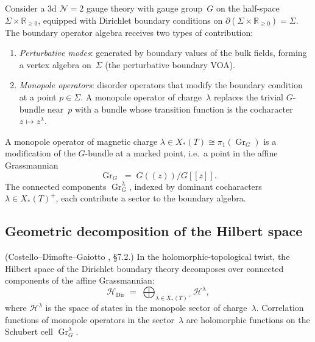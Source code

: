 \providecommand{\GrG}{\operatorname{Gr}_G}

Consider a 3d $\mathcal{N}=2$ gauge theory with gauge group~$G$ on
the half-space $\Sigma \times \mathbb{R}_{\geq 0}$, equipped with
Dirichlet boundary conditions on $\partial(\Sigma \times
\mathbb{R}_{\geq 0}) = \Sigma$. The boundary operator algebra
receives two types of contribution:
\begin{enumerate}[label=(\roman*),nosep]
\item \emph{Perturbative modes}: generated by boundary values of the
 bulk fields, forming a vertex algebra on~$\Sigma$ (the perturbative
 boundary VOA).
\item \emph{Monopole operators}: disorder operators that modify the
 boundary condition at a point $p \in \Sigma$. A monopole operator
 of charge~$\lambda$ replaces the trivial $G$-bundle near~$p$ with a
 bundle whose transition function is the cocharacter
 $z \mapsto z^\lambda$.
\end{enumerate}

\begin{definition}
\label{def:monopole-grassmannian}
A monopole operator of magnetic charge
$\lambda \in X_*(T) \cong \pi_1(\GrG)$ is a modification of the
$G$-bundle at a marked point, i.e.\ a point in the affine
Grassmannian
\begin{equation}\label{eq:affine-grassmannian-def}
 \GrG \;=\; G(\!(z)\!)/G[\![z]\!].
\end{equation}
The connected components $\GrG^\lambda$, indexed by dominant
cocharacters $\lambda \in X_*(T)^+$, each contribute a sector to the
boundary algebra.
\end{definition}

\subsection{Geometric decomposition of the Hilbert space}
\label{sec:monopole-hilbert-decomposition}

\begin{proposition}
\label{prop:monopole-hilbert-decomp}
\textup{(Costello--Dimofte--Gaiotto \cite{CDG2023}, \S7.2.)}
In the holomorphic-topological twist, the Hilbert space of the
Dirichlet boundary theory decomposes over connected components of
the affine Grassmannian:
\begin{equation}\label{eq:monopole-hilbert-decomp}
 \mathcal{H}_{\mathrm{Dir}}
 \;=\;
 \bigoplus_{\lambda \in X_*(T)^+}
 \mathcal{H}^\lambda,
\end{equation}
where $\mathcal{H}^\lambda$ is the space of states in the monopole
sector of charge~$\lambda$. Correlation functions of monopole
operators in the sector~$\lambda$ are holomorphic functions on the
Schubert cell $\GrG^\lambda$.
\end{proposition}

